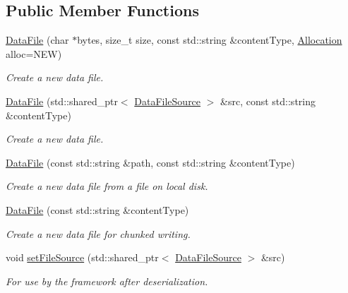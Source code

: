 \subsection*{Public Member Functions}
\begin{DoxyCompactItemize}
\item 
\hyperlink{classBUSBOY_1_1DataFile_a61a6181448c5cafa808e37f62999bcbf}{DataFile} (char $\ast$bytes, size\_\-t size, const std::string \&contentType, \hyperlink{classBUSBOY_1_1DataFile_aff6de50b1c1e19698f0b4fdf2c62e02b}{Allocation} alloc=NEW)
\begin{DoxyCompactList}\small\item\em Create a new data file. \item\end{DoxyCompactList}\item 
\hyperlink{classBUSBOY_1_1DataFile_a1dad37f234d3029bcab2cd9a9060827f}{DataFile} (std::shared\_\-ptr$<$ \hyperlink{classBUSBOY_1_1DataFileSource}{DataFileSource} $>$ \&src, const std::string \&contentType)
\begin{DoxyCompactList}\small\item\em Create a new data file. \item\end{DoxyCompactList}\item 
\hyperlink{classBUSBOY_1_1DataFile_ade698e33f20a594f3bf954992c0b55f2}{DataFile} (const std::string \&path, const std::string \&contentType)
\begin{DoxyCompactList}\small\item\em Create a new data file from a file on local disk. \item\end{DoxyCompactList}\item 
\hyperlink{classBUSBOY_1_1DataFile_a617078d4b703345b0c18b179423316bd}{DataFile} (const std::string \&contentType)
\begin{DoxyCompactList}\small\item\em Create a new data file for chunked writing. \item\end{DoxyCompactList}\item 
void \hyperlink{classBUSBOY_1_1DataFile_ad61684b1f604a6a59acd656620113987}{setFileSource} (std::shared\_\-ptr$<$ \hyperlink{classBUSBOY_1_1DataFileSource}{DataFileSource} $>$ \&src)
\begin{DoxyCompactList}\small\item\em For use by the framework after deserialization. \item\end{DoxyCompactList}\item 

\end{DoxyCompactItemize}
